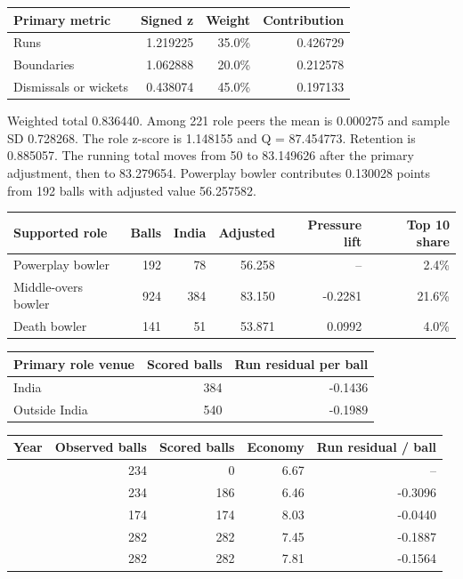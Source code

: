 \begin{center}
\begin{tabularx}{\linewidth}{>{\raggedright\arraybackslash}Xrrr}
\toprule
Primary metric & Signed z & Weight & Contribution \\
\midrule
Runs & 1.219225 & 35.0\% & 0.426729 \\
Boundaries & 1.062888 & 20.0\% & 0.212578 \\
Dismissals or wickets & 0.438074 & 45.0\% & 0.197133 \\
\bottomrule
\end{tabularx}
\end{center}

Weighted total 0.836440. Among 221 role peers the mean is 0.000275 and sample SD 0.728268. The role z-score is 1.148155 and Q = 87.454773. Retention is 0.885057. The running total moves from 50 to 83.149626 after the primary adjustment, then to 83.279654. Powerplay bowler contributes 0.130028 points from 192 balls with adjusted value 56.257582.

\begin{center}
\begin{tabularx}{\linewidth}{>{\raggedright\arraybackslash}Xrrrrr}
\toprule
Supported role & Balls & India & Adjusted & Pressure lift & Top 10 share \\
\midrule
Powerplay bowler & 192 & 78 & 56.258 & -- & 2.4\% \\
Middle-overs bowler & 924 & 384 & 83.150 & -0.2281 & 21.6\% \\
Death bowler & 141 & 51 & 53.871 & 0.0992 & 4.0\% \\
\bottomrule
\end{tabularx}
\end{center}

\begin{center}
\begin{tabularx}{\linewidth}{>{\raggedright\arraybackslash}Xrr}
\toprule
Primary role venue & Scored balls & Run residual per ball \\
\midrule
India & 384 & -0.1436 \\
Outside India & 540 & -0.1989 \\
\bottomrule
\end{tabularx}
\end{center}

\begin{center}
\begin{tabularx}{\linewidth}{>{\raggedright\arraybackslash}Xrrrr}
\toprule
Year & Observed balls & Scored balls & Economy & Run residual / ball \\
\midrule
2022 & 234 & 0 & 6.67 & -- \\
2023 & 234 & 186 & 6.46 & -0.3096 \\
2024 & 174 & 174 & 8.03 & -0.0440 \\
2025 & 282 & 282 & 7.45 & -0.1887 \\
2026 & 282 & 282 & 7.81 & -0.1564 \\
\bottomrule
\end{tabularx}
\end{center}

